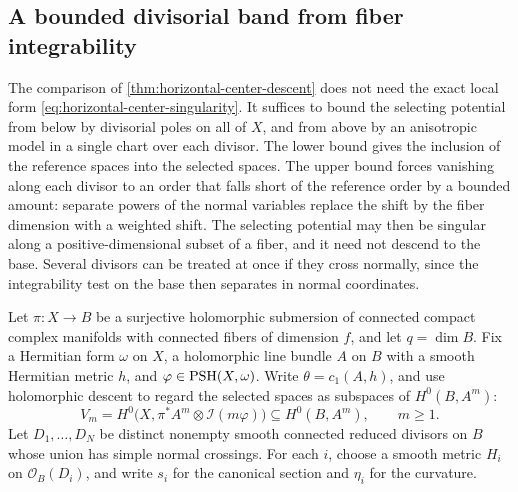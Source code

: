 \subsection{A bounded divisorial band from fiber integrability}
\label{sec:fiber-integrability-band}

The comparison of \cref{thm:horizontal-center-descent} does not need the exact local form \eqref{eq:horizontal-center-singularity}. It suffices to bound the selecting potential from below by divisorial poles on all of $X$, and from above by an anisotropic model in a single chart over each divisor. The lower bound gives the inclusion of the reference spaces into the selected spaces. The upper bound forces vanishing along each divisor to an order that falls short of the reference order by a bounded amount: separate powers of the normal variables replace the shift by the fiber dimension with a weighted shift. The selecting potential may then be singular along a positive-dimensional subset of a fiber, and it need not descend to the base. Several divisors can be treated at once if they cross normally, since the integrability test on the base then separates in normal coordinates.

Let $\pi\colon X\to B$ be a surjective holomorphic submersion of connected compact complex manifolds with connected fibers of dimension $f$, and let $q=\dim B$. Fix a Hermitian form $\omega$ on $X$, a holomorphic line bundle $A$ on $B$ with a smooth Hermitian metric $h$, and $\varphi\in\mathrm{PSH}(X,\omega)$. Write $\theta=c_1(A,h)$, and use holomorphic descent to regard the selected spaces as subspaces of $H^0(B,A^m)$:
\[
 V_m=H^0\bigl(X,\pi^*A^m\otimes\mathcal I(m\varphi)\bigr)
       \subseteq H^0(B,A^m),\qquad m\geq1.
\]
Let $D_1,\ldots,D_N$ be distinct nonempty smooth connected reduced divisors on $B$ whose union has simple normal crossings. For each $i$, choose a smooth metric $H_i$ on $\mathcal O_B(D_i)$, and write $s_i$ for the canonical section and $\eta_i$ for the curvature.

